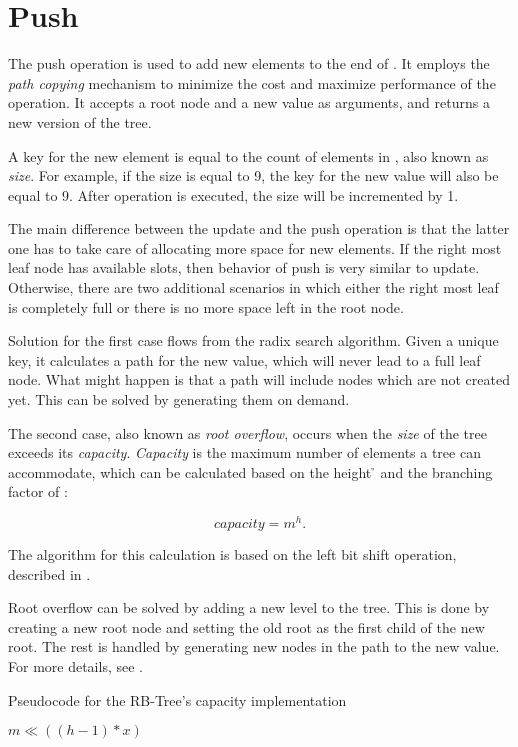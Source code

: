 \section{Push} 
The push operation is used to add new elements to the end of \rbtree{}. It employs the \emph{path copying} mechanism to minimize the cost and maximize performance of the operation. It accepts a root node and a new value as arguments, and returns a new version of the tree. 

A key for the new element is equal to the count of elements in \rbtree{}, also known as \emph{size}. For example, if the size is equal to 9, the key for the new value will also be equal to 9. After operation is executed, the size will be incremented by 1. 

The main difference between the update and the push operation is that the latter one has to take care of allocating more space for new elements. If the right most leaf node has available slots, then behavior of push is very similar to update. Otherwise, there are two additional scenarios in which either the right most leaf is completely full or there is no more space left in the root node. 

Solution for the first case flows from the radix search algorithm. Given a unique key, it calculates a path for the new value, which will never lead to a full leaf node. What might happen is that a path will include nodes which are not created yet. This can be solved by generating them on demand. 

The second case, also known as \emph{root overflow}, occurs when the \emph{size} of the tree exceeds its \emph{capacity}. \emph{Capacity} is the maximum number of elements a tree can accommodate, which can be calculated based on the height \h{} and the branching factor \m{} of \rbtree{}:

\begin{equation}
	capacity = m^h.
\end{equation}

The algorithm for this calculation is based on the left bit shift operation, described in . 

Root overflow can be solved by adding a new level to the tree. This is done by creating a new root node and setting the old root as the first child of the new root. The rest is handled by generating new nodes in the path to the new value. For more details, see . 

\begin{listing}[ht!]        
    \caption{Pseudocode for the RB-Tree's capacity implementation}
    \label{lst:rb-tree-capacity}
    
    \begin{algorithmic}
		\State \Return $m \ll ((h - 1) * x)$
        \EndFunction
    \end{algorithmic}
\end{listing}


